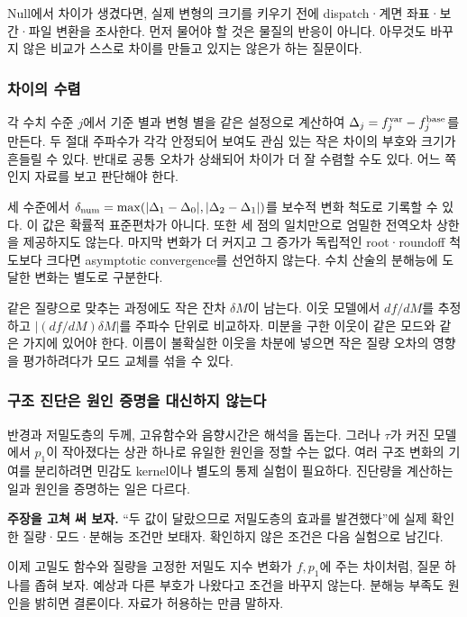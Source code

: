 \documentclass[
  10pt,
  a4paper,
]{article}
\begin{document}
Null에서 차이가 생겼다면, 실제 변형의 크기를 키우기 전에 dispatch·계면
좌표·보간·파일 변환을 조사한다. 먼저 물어야 할 것은 물질의 반응이
아니다. 아무것도 바꾸지 않은 비교가 스스로 차이를 만들고 있지는 않은가
하는 질문이다.

\subsubsection{차이의 수렴}\label{uxcc28uxc774uxc758-uxc218uxb834}

각 수치 수준 \(j\)에서 기준 별과 변형 별을 같은 설정으로 계산하여
\(\Delta_j=f_j^{\rm var}-f_j^{\rm base}\)를 만든다. 두 절대 주파수가
각각 안정되어 보여도 관심 있는 작은 차이의 부호와 크기가 흔들릴 수 있다.
반대로 공통 오차가 상쇄되어 차이가 더 잘 수렴할 수도 있다. 어느 쪽인지
자료를 보고 판단해야 한다.

세 수준에서
\(\delta_{\rm num}=\max(|\Delta_1-\Delta_0|,|\Delta_2-\Delta_1|)\)를
보수적 변화 척도로 기록할 수 있다. 이 값은 확률적 표준편차가 아니다.
또한 세 점의 일치만으로 엄밀한 전역오차 상한을 제공하지도 않는다. 마지막
변화가 더 커지고 그 증가가 독립적인 root·roundoff 척도보다 크다면
asymptotic convergence를 선언하지 않는다. 수치 산술의 분해능에 도달한
변화는 별도로 구분한다.

같은 질량으로 맞추는 과정에도 작은 잔차 \(\delta M\)이 남는다. 이웃
모델에서 \(df/dM\)를 추정하고 \(|(df/dM)\delta M|\)를 주파수 단위로
비교하자. 미분을 구한 이웃이 같은 모드와 같은 가지에 있어야 한다. 이름이
불확실한 이웃을 차분에 넣으면 작은 질량 오차의 영향을 평가하려다가 모드
교체를 섞을 수 있다.

\subsubsection{구조 진단은 원인 증명을 대신하지
않는다}\label{uxad6cuxc870-uxc9c4uxb2e8uxc740-uxc6d0uxc778-uxc99duxba85uxc744-uxb300uxc2e0uxd558uxc9c0-uxc54auxb294uxb2e4}

반경과 저밀도층의 두께, 고유함수와 음향시간은 해석을 돕는다. 그러나
\(\tau\)가 커진 모델에서 \(p_1\)이 작아졌다는 상관 하나로 유일한 원인을
정할 수는 없다. 여러 구조 변화의 기여를 분리하려면 민감도 kernel이나
별도의 통제 실험이 필요하다. 진단량을 계산하는 일과 원인을 증명하는 일은
다르다.

\textbf{주장을 고쳐 써 보자.} ``두 값이 달랐으므로 저밀도층의 효과를
발견했다''에 실제 확인한 질량·모드·분해능 조건만 보태자. 확인하지 않은
조건은 다음 실험으로 남긴다.

이제 고밀도 함수와 질량을 고정한 저밀도 지수 변화가 \(f,p_1\)에 주는
차이처럼, 질문 하나를 좁혀 보자. 예상과 다른 부호가 나왔다고 조건을
바꾸지 않는다. 분해능 부족도 원인을 밝히면 결론이다. 자료가 허용하는
만큼 말하자.
\end{document}
